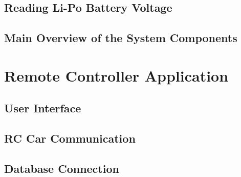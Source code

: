 \subsection{Reading Li-Po Battery Voltage} \label{sec_read_lipo_voltage}

\subsection{Main Overview of the System Components} \label{main_system_components}

\section{Remote Controller Application} \label{sec_remote_app}

\subsection{User Interface} \label{sec_user_interface}

\subsection{RC Car Communication} \label{sec_rc_comm}

\subsection{Database Connection} \label{sec_db_connection}



